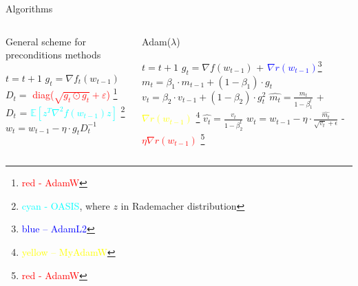 \documentclass[aspectratio=169, 12pt]{beamer}
\begin{document}
\begin{frame}{Algorithms}
    \begin{columns}
		\begin{column}{0.5\textwidth}
			\begin{algorithm}[H]
            
            \caption{General scheme for preconditions methods}\label{alg:genalg}
    
            \begin{algorithmic}
            \small{
            
            \State $t = t+1$
            \State $g_t = \nabla f_t(w_{t-1})$
            \State $D_t =$ \textcolor{red}{diag($\sqrt{g_t \odot g_t} + \varepsilon$)} \footnote[1]{\textcolor{red}{red - AdamW}}
            \State $D_t$ = \textcolor{cyan}{$\mathbb{E}[z^T \nabla^2f(w_{t-1}) z]$} \footnote[2]{\textcolor{cyan}{cyan - OASIS}, where $z$ in Rademacher distribution}
            \State $w_t = w_{t-1} - \eta \cdot g_t D_t^{-1}$    
            \EndWhile
            }
\end{algorithmic}
\end{algorithm}
		\end{column}
		
		\begin{column}{0.55\textwidth} 
	     	
            \begin{algorithm}[H]
            
            \caption{Adam($\lambda$)}\label{alg:Adam}
    
            \begin{algorithmic}
            \small{
            \State $t = t+1$
            \State $g_t = \nabla f(w_{t-1})$ + \textcolor{blue}{$\nabla r(w_{t-1})$}\footnote{\textcolor{blue}{blue -- AdamL2}} 
            \State $m_t = \beta_1 \cdot m_{t-1} + (1 - \beta_1) \cdot g_t$
            \State $v_t = \beta_2 \cdot v_{t-1} + (1 - \beta_2) \cdot g_t^2$
            \State $\hat{m_t} = \frac{m_t}{1-\beta_1^t}$ + \textcolor{yellow}{$\nabla r(w_{t-1})$} \footnote{\textcolor{yellow}{yellow -- MyAdamW}}
            \State $\hat{v_t} = \frac{v_t}{1-\beta_2^t}$ 
            \State $w_t = w_{t-1} - \eta \cdot \frac{\hat{m_t}}{\sqrt{v_t} + \epsilon}$    - \textcolor{red}{$\eta \nabla r(w_{t-1})$ } \footnote{\textcolor{red}{red - AdamW}}
            \EndWhile
            }
\end{algorithmic}
\end{algorithm}


		\end{column}
	\end{columns}
\end{frame}
\end{document}
